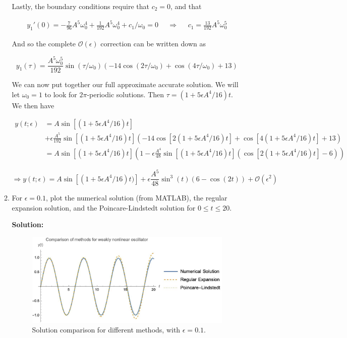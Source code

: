 \documentclass[12pt, a4paper]{article}
\begin{document}
\begin{enumerate}
\begin{enumerate}
    Lastly, the boundary conditions require that $c_2=0$, and that 

    \begin{align*}
        y_1'(0) = - \frac{7}{96} A^5 \omega_0^4 + \frac{1}{192} A^5 \omega_0^4 + c_1/\omega_0 = 0 &&
        \Rightarrow && c_1 = \frac{13}{192} A^5 \omega_0^5
    \end{align*}

    And so the complete $\mathcal{O}(\epsilon)$ correction can be written down as 

    $$y_1(\tau) = \frac{A^5 \omega_0^5}{192} \sin(\tau/\omega_0) \left( -14 \cos(2\tau/\omega_0) + \cos(4\tau/\omega_0) + 13 \right)$$

    We can now put together our full approximate accurate solution. We will let $\omega_0=1$ to look for $2\pi$-periodic solutions. Then $\tau = (1 + 5\epsilon A^4/16)t$. We then have

    \begin{align*}
        y(t; \epsilon) &= A \sin[(1 + 5\epsilon A^4/16)t] \\&+ \epsilon \frac{A^5}{192} \sin[(1 + 5\epsilon A^4/16)t]\left( -14 \cos[2(1 + 5\epsilon A^4/16)t] + \cos[4(1 + 5\epsilon A^4/16)t] + 13 \right) \\
        &= A \sin[(1+ 5\epsilon A^4/16)t]\left( 1 - \epsilon \frac{A^4}{48} \sin[(1+5\epsilon A^4/16)t] \left( \cos[2(1+5\epsilon A^4/16)t]-6\right)\right)
    \end{align*}

    
    $$\Rightarrow y(t;\epsilon) = A \sin[(1 + 5\epsilon A^4/16)t)] + \epsilon \frac{A^5}{48} \sin^3(t)(6- \cos(2t))+ \mathcal{O}(\epsilon^2)$$

    \item For $\epsilon = 0.1$, plot the numerical solution (from MATLAB), the regular expansion solution, and the Poincare-Lindstedt solution for $0 \le t \le 20$.

    \textbf{Solution:}

    \begin{figure}[H]
    \centering
    \includegraphics[width=14cm]{Fig1.jpg}
    \caption{Solution comparison for different methods, with $\epsilon=0.1$.}
\end{figure}


\end{enumerate}
\end{enumerate}
\end{document}
